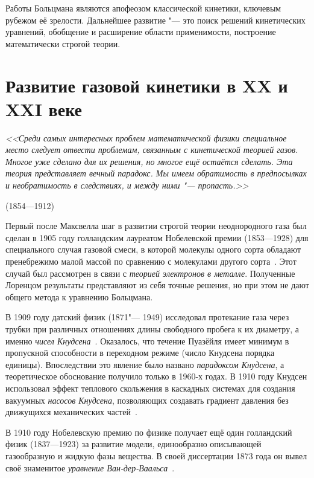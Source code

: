 \documentclass[a4paper, 12pt, oneside]{article} %
\begin{document}
Работы Больцмана являются апофеозом классической кинетики, ключевым
рубежом её зрелости. Дальнейшее развитие "--- это поиск решений
кинетических уравнений, обобщение и расширение области применимости,
построение математически строгой теории.

\section{Развитие газовой кинетики в XX и XXI веке}

\epigraph{\textit{<<Среди самых интересных проблем математической физики
специальное место следует отвести проблемам, связанным с кинетической
теорией газов. Многое уже сделано для их решения, но многое ещё остаётся
сделать. Эта теория представляет вечный парадокс. Мы имеем обратимость в
предпосылках и необратимость в следствиях, и между ними "---
пропасть.>>}}{ (1854---1912)}

Первый после Максвелла шаг в развитии строгой теории неоднородного газа
был сделан в 1905 году голландским лауреатом Нобелевской премии
 (1853---1928) для специального случая
газовой смеси, в которой молекулы одного сорта обладают пренебрежимо
малой массой по сравнению с молекулами другого
сорта~\cite{lorentz1905motion}. Этот случай был рассмотрен в связи с
\emph{теорией электронов в металле}. Полученные Лоренцом результаты
представляют из себя точные решения, но при этом не дают общего метода к
уравнению Больцмана.

В 1909 году датский физик  (1871"--- 1949)
исследовал протекание газа через трубки при различных отношениях длины
свободного пробега к их диаметру, а именно \emph{чисел
Кнудсена}~\cite{knudsen1909gesetze}. Оказалось, что течение Пуазёйля
имеет минимум в пропускной способности в переходном режиме (число
Кнудсена порядка единицы). Впоследствии это явление было названо
\emph{парадоксом Кнудсена}, а теоретическое обоснование получило только
в 1960-х годах. В 1910 году Кнудсен использовал эффект теплового
скольжения в каскадных системах для создания вакуумных \emph{насосов
Кнудсена}, позволяющих создавать градиент давления без движущихся
механических частей~\cite{knudsen1909revision}.

В 1910 году Нобелевскую премию по физике получает ещё один голландский
физик  (1837---1923) за развитие модели,
единообразно описывающей газообразную и жидкую фазы вещества. В своей
диссертации 1873 года он вывел своё знаменитое \emph{уравнение
Ван-дер-Ваальса}~\cite{waals1873equation}.
\end{document}
